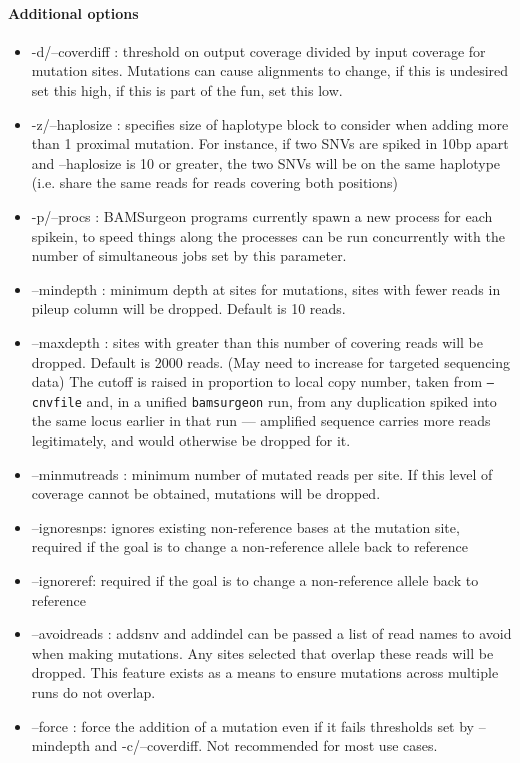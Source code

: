 \documentclass[letterpaper,11pt]{article}
\begin{document}
\paragraph{Additional options}
\begin{itemize}
\item -d/--coverdiff : threshold on output coverage divided by input coverage for mutation sites. Mutations can cause alignments to change, if this is undesired set this high, if this is part of the fun, set this low.
\item -z/--haplosize : specifies size of haplotype block to consider when adding more than 1 proximal mutation. For instance, if two SNVs are spiked in 10bp apart and --haplosize is 10 or greater, the two SNVs will be on the same haplotype (i.e. share the same reads for reads covering both positions)
\item -p/--procs : BAMSurgeon programs currently spawn a new process for each spikein, to speed things along the processes can be run concurrently with the number of simultaneous jobs set by this parameter.
\item --mindepth : minimum depth at sites for mutations, sites with fewer reads in pileup column will be dropped. Default is 10 reads.
\item --maxdepth : sites with greater than this number of covering reads will be dropped. Default is 2000 reads. (May need to increase for targeted sequencing data) The cutoff is raised in proportion to local copy number, taken from \texttt{--cnvfile} and, in a unified \texttt{bamsurgeon} run, from any duplication spiked into the same locus earlier in that run --- amplified sequence carries more reads legitimately, and would otherwise be dropped for it.
\item --minmutreads : minimum number of mutated reads per site. If this level of coverage cannot be obtained, mutations will be dropped.
\item --ignoresnps: ignores existing non-reference bases at the mutation site, required if the goal is to change a non-reference allele back to reference
\item --ignoreref: required if the goal is to change a non-reference allele back to reference
\item --avoidreads : addsnv and addindel can be passed a list of read names to avoid when making mutations. Any sites selected that overlap these reads will be dropped. This feature exists as a means to ensure mutations across multiple runs do not overlap.
\item --force : force the addition of a mutation even if it fails thresholds set by --mindepth and -c/--coverdiff. Not recommended for most use cases.

\end{itemize}
\end{document}
